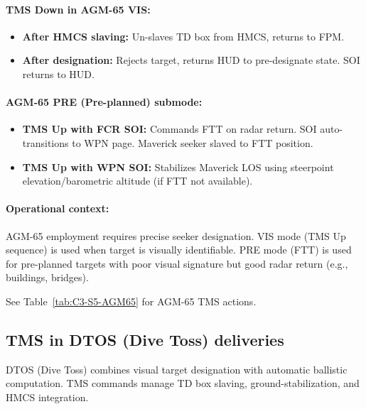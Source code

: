 \documentclass[11pt, a4paper, twoside]{report}
\begin{document}
\paragraph{TMS Down in AGM-65 VIS:}
\begin{itemize}
    \item \textbf{After HMCS slaving:} Un-slaves TD box from HMCS, returns to FPM.
    \item \textbf{After designation:} Rejects target, returns HUD to pre-designate state. SOI returns to HUD.
\end{itemize}

\paragraph{AGM-65 PRE (Pre-planned) submode:}
\begin{itemize}
    \item \textbf{TMS Up with FCR SOI:} Commands FTT on radar return. SOI auto-transitions to WPN page. Maverick seeker slaved to FTT position.
    \item \textbf{TMS Up with WPN SOI:} Stabilizes Maverick LOS using steerpoint elevation/barometric altitude (if FTT not available).
\end{itemize}

\paragraph{Operational context:}
AGM-65 employment requires precise seeker designation. VIS mode (TMS Up sequence) is used when target is visually identifiable. PRE mode (FTT) is used for pre-planned targets with poor visual signature but good radar return (e.g., buildings, bridges).

See Table~\ref{tab:C3-S5-AGM65} for AGM-65 TMS actions.

\subsection{TMS in DTOS (Dive Toss) deliveries}
\label{sec:C3-S5-S2}

DTOS (Dive Toss) combines visual target designation with automatic ballistic computation. TMS commands manage TD box slaving, ground-stabilization, and HMCS integration.
\end{document}
